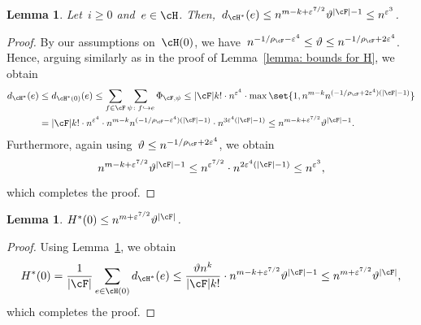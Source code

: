 \documentclass[11pt]{amsart}
\newcommand{\eps}{\varepsilon}
\DeclarePairedDelimiter{\abs}{\lvert}{\rvert}
\renewcommand{\theta}{\vartheta}
\newcommand{\injection}{\hookrightarrow}
\newtheorem{lemma}[algocf]{Lemma}
\theoremstyle{definition}
\numberwithin{equation}{section}
\begin{document}
	\begin{lemma}\label{lemma: F embeddings bound}
		Let~$i\geq 0$ and~$e\in\cH$.
		Then,~$d_{\cH^*}(e)\leq n^{m-k+\eps^{7/2}}\theta^{\abs{\cF}-1}\leq n^{\eps^3}$.
	\end{lemma}
	\begin{proof}
		By our assumptions on~$\cH(0)$, we have~$n^{-1/\rho_\cF-\eps^4}\leq\theta\leq n^{-1/\rho_\cF+2\eps^4}$.
		Hence, arguing similarly as in the proof of Lemma~\ref{lemma: bounds for H}, we obtain
		\begin{equation*}
			\begin{aligned}
				d_{\cH^*}(e)
				&\leq d_{\cH^*(0)}(e)
				\leq \sum_{f\in\cF}\sum_{\psi\colon f\injection e} \Phi_{\cF,\psi}
				\leq \abs{\cF}k!\cdot n^{\eps^4}\cdot\max\set{ 1,n^{m-k}n^{(-1/\rho_\cF+2\eps^4)(\abs{\cF}-1)} }\\
				&=\abs{\cF}k!\cdot n^{\eps^4}\cdot n^{m-k} n^{(-1/\rho_\cF-\eps^4)(\abs{\cF}-1)}\cdot n^{3\eps^4(\abs{\cF}-1)}
				\leq n^{m-k+\eps^{7/2}}\theta^{\abs{\cF}-1}.
			\end{aligned}
		\end{equation*}
		Furthermore, again using~$\theta\leq n^{-1/\rho_\cF+2\eps^4}$, we obtain
		\begin{equation*}
			n^{m-k+\eps^{7/2}}\theta^{\abs{\cF}-1}
			\leq n^{\eps^{7/2}}\cdot n^{2\eps^4(\abs{\cF}-1)}
			\leq n^{\eps^3},
		\end{equation*}
		which completes the proof.
	\end{proof}
	
	\begin{lemma}\label{lemma: initial copy bound}
		$H^*(0)\leq n^{m+\eps^{7/2}}\theta^{\abs{\cF}}$.
	\end{lemma}
	\begin{proof}
		Using Lemma~\ref{lemma: F embeddings bound}, we obtain
		\begin{equation*}
			H^*(0)
			=\frac{1}{\abs{\cF}}\sum_{e\in\cH(0)} d_{\cH^*}(e)
			\leq \frac{\theta n^k}{\abs{\cF}k!} \cdot n^{m-k+\eps^{7/2}}\theta^{\abs{\cF}-1}
			\leq n^{m+\eps^{7/2}}\theta^{\abs{\cF}},
		\end{equation*}
		which completes the proof.
	\end{proof}
	
	
\end{document}
